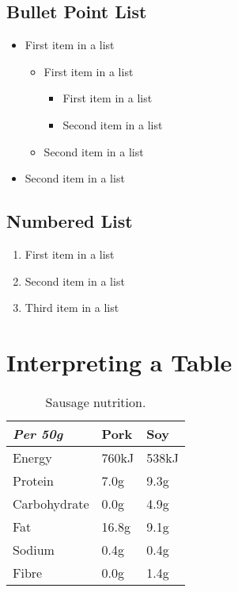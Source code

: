 \documentclass[11pt]{scrartcl} %
\begin{document}
{\subsection{Bullet Point List}

\begin{itemize}
	\item First item in a list
	      \begin{itemize}
		      \item First item in a list
		            \begin{itemize}
			            \item First item in a list
			            \item Second item in a list
		            \end{itemize}
		      \item Second item in a list
	      \end{itemize}
	\item Second item in a list
\end{itemize}


\subsection{Numbered List}

\begin{enumerate}
	\item First item in a list
	\item Second item in a list
	\item Third item in a list
\end{enumerate}


\section{Interpreting a Table}

\begin{table}[h] %
	\centering %
	\begin{tabular}{l l l}
		\toprule
		\textit{Per 50g} & \textbf{Pork} & \textbf{Soy} \\
		\midrule
		Energy           & 760kJ         & 538kJ        \\
		Protein          & 7.0g          & 9.3g         \\
		Carbohydrate     & 0.0g          & 4.9g         \\
		Fat              & 16.8g         & 9.1g         \\
		Sodium           & 0.4g          & 0.4g         \\
		Fibre            & 0.0g          & 1.4g         \\
		\bottomrule
	\end{tabular}
	\caption{Sausage nutrition.}
\end{table}

}
\end{document}
